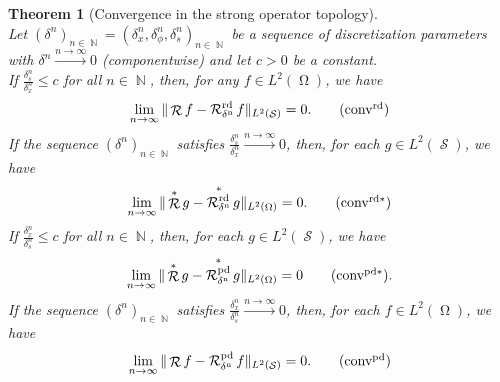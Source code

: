 \documentclass[11pt,reqno]{amsart}
\DeclareMathOperator{\NN}{\mathbb{N}}
\DeclareMathOperator{\Radon}{\mathcal{R}}
\DeclareMathOperator{\RayRadonN}{\mathcal{R}^\mathrm{rd}_{\delta^n}}
\DeclareMathOperator{\PixelRadonN}{\mathcal{R}^\mathrm{pd}_{\delta^n}}
\DeclareMathOperator{\imgdom}{\Omega}
\DeclareMathOperator{\sinodom}{\mathcal{S}}
\newtheorem{theorem}{Theorem}
\numberwithin{theorem}{section}
\theoremstyle{remark}
\begin{document}
\begin{theorem}[Convergence in the strong operator topology] \label{Thm_approximation_ray_driven} \ \\
    Let $(\delta^n)_{n\in \NN}=(\delta_x^n,\delta_\phi^n,\delta_s^n)_{n\in \NN}$ be a  sequence of discretization parameters with $\delta^n\overset{n\to \infty}{\to} 0$ (componentwise) and let $c>0$ be a constant.
    \\ If $\frac{\delta_s^n}{\delta_x^n} \leq c$ for all $n\in \NN$, then,  for any $f\in L^2(\imgdom)$, we have
    \begin{equation}\label{equ_thm_ray_radon}
        \lim_{n\to \infty} \|\Radon f-\RayRadonN f\|_{L^2(\sinodom)}=0.
        \tag{$\textrm{conv}^\mathrm{rd}$}
    \end{equation}
    If the sequence $(\delta^n)_{n\in \NN}$ satisfies $\frac{\delta_s^n}{\delta_x^n}\overset{n\to \infty}{\to} 0$, then, for each $g\in L^2(\sinodom)$, we have
        \begin{equation}\label{equ_thm_ray_estimate_backprojeciton}
        \lim_{n\to \infty} \|\Radon^* g-\RayRadonN^* g\|_{L^2(\imgdom)}=0.
        \tag{$\textrm{conv}^\mathrm{rd*}$}
    \end{equation}
        If $\frac{\delta_x^n}{\delta_s^n} \leq c$ for all $n\in \NN$, then, for each $g\in L^2(\sinodom)$, we have
    \begin{equation}\label{equ_thm_pixel_backprojection}
        \lim_{n\to \infty}\|\Radon^* g - \PixelRadonN^* g\|_{L^2(\imgdom)} =0
        \tag{$\textrm{conv}^\mathrm{pd*}$}.
    \end{equation}
       If the sequence $(\delta^n)_{n\in \NN}$ satisfies $\frac{\delta_x^n}{\delta_s^n}\overset{n\to \infty}{\to} 0$, then, for each $f\in L^2(\imgdom)$, we have
        \begin{equation}\label{equ_thm_pixel_radon}
        \lim_{n\to \infty} \|\Radon f-\PixelRadonN f\|_{L^2(\sinodom)}=0.
        \tag{$\textrm{conv}^\mathrm{pd}$}
    \end{equation}
\end{theorem}
\end{document}
